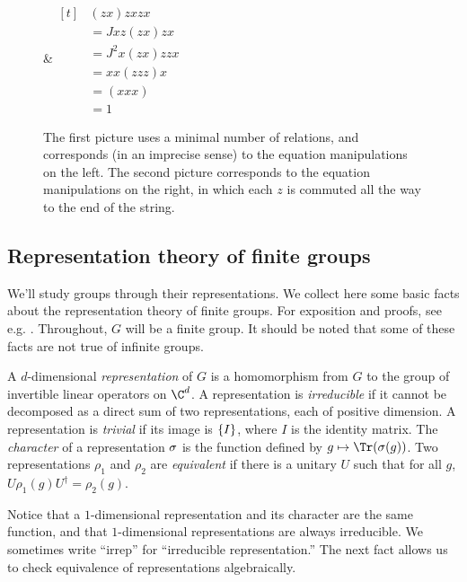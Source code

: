 \begin{example}
\begin{figure}[h]
\begin{tabular}
		&$\begin{aligned}[t]
				  &(zx)zxzx\\
				  &=Jxz(zx)zx\\
				  &=J^2x(zx)zzx\\
				  &=xx(zzz)x\\
				  &=(xxx)\\
				  &=1
				\end{aligned}$
		\end{tabular}
	\caption{The first picture uses a minimal number of relations, and corresponds (in an imprecise sense) to the equation manipulations on the left. The second picture corresponds to the equation manipulations on the right, in which each $z$ is commuted all the way to the end of the string.
}
	\label{fig:xz-group-picture}
\end{figure}
\end{example}

\subsection{Representation theory of finite groups}


We'll study groups through their representations. We collect here some basic facts about the representation theory of finite groups. For exposition and proofs, see e.g. \cite{dummit2004abstract}. Throughout, $G$ will be a finite group. It should be noted that some of these facts are not true of infinite groups. 


\begin{definition}
	A $d$-dimensional \emph{representation} of $G$ is a homomorphism from $G$ to the group of invertible linear operators on $\C^d$.
	A representation is \emph{irreducible} if it cannot be decomposed as a direct sum of two representations, each of positive dimension.
	A representation is \emph{trivial} if its image is $\left\{I\right\}$, where $I$ is the identity matrix.
	The \emph{character} of a representation $\sigma$ is the function defined by $g\mapsto \Tr(\s(g))$. 
	Two representations $\rho_1$ and $\rho_2$ are \emph{equivalent} if there is a unitary $U$ such that for all $g$, $U\rho_1(g) U^\dagger = \rho_2(g)$.
\end{definition}
Notice that a $1$-dimensional representation and its character are the same function, and that $1$-dimensional representations are always irreducible. We sometimes write ``irrep'' for ``irreducible representation.'' The next fact allows us to check equivalence of representations algebraically.

